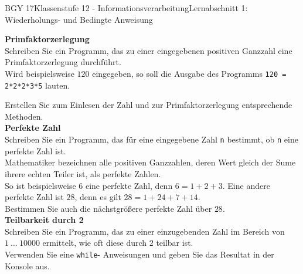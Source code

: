 \documentclass[oneside,openany,headings=optiontotoc,11pt,numbers=noenddot]{scrreprt}
\begin{document}
\begin{worksheet}{BGY 17}{Klassenstufe 12 - Informationsverarbeitung}{Lernabschnitt 1: Wiederholungs- und Bedingte Anweisung}
\begin{framed}
			\par\noindent
			\textbf{Primfaktorzerlegung}\\
			Schreiben Sie ein Programm, das zu einer eingegebenen positiven Ganzzahl eine Primfaktorzerlegung durchführt.\\
			Wird beispielsweise \(120\) eingegeben, so soll die Ausgabe des Programms \lstinline[style=JavaInputStyle]|120 = 2*2*2*3*5| lauten.\\
			\par
			Erstellen Sie zum Einlesen der Zahl und zur Primfaktorzerlegung entsprechende Methoden.\\
			\textbf{Perfekte Zahl}\\
			Schreiben Sie ein Programm, das für eine eingegebene Zahl \lstinline[style=JavaInputStyle]|n| bestimmt, ob \lstinline[style=JavaInputStyle]|n| eine perfekte Zahl ist.\\
			Mathematiker bezeichnen alle positiven Ganzzahlen, deren Wert gleich der Sume ihrere echten Teiler ist, als perfekte Zahlen.\\
			So ist beispielsweise \(6\) eine perfekte Zahl, denn \(6 = 1 + 2 + 3\). Eine andere perfekte Zahl ist \(28\), denn es gilt \(28 = 1 + 2 4 + 7 + 14\).\\
			Bestimmen Sie auch die nächstgrößere perfekte Zahl über \(28\).\\
			\textbf{Teilbarkeit durch 2}\\
			Schreiben Sie ein Programm, das zu einer einzugebenden Zahl im Bereich von \(1\ \ldots\ 10000\) ermittelt, wie oft diese durch \(2\) teilbar ist.\\
			Verwenden Sie eine \lstinline[style=JavaInputStyle]|while|- Anweisungen und geben Sie das Resultat in der Konsole aus.
		\end{framed}
	\end{worksheet}
\end{document}
